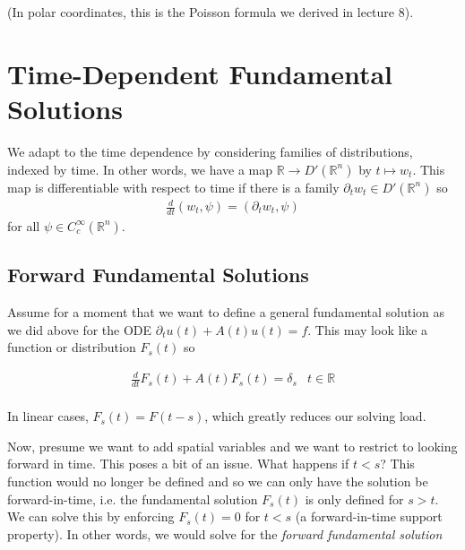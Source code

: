 \documentclass{article}
\newcommand{\R}{{\mathbb{R}}}
\newcommand{\pd}{\partial}
\begin{document}
	(In polar coordinates, this is the Poisson formula we derived in lecture 8).
	
	\section{Time-Dependent Fundamental Solutions}
	
	We adapt to the time dependence by considering families of distributions, indexed by time. In other words, we have a map $\R \to D'(\R^{n})$ by $t \mapsto w_{t}$. This map is differentiable with respect to time if there is a family $\pd_{t} w_{t} \in D'(\R^{n})$ so 
	\begin{align*}
		\frac{d}{dt} (w_{t},\psi) = (\pd_{t}w_{t},\psi)
	\end{align*}
	for all $\psi \in C_{c}^{\infty}(\R^{n})$. 
	
	\subsection{Forward Fundamental Solutions}
	
	
	Assume for a moment that we want to define a general fundamental solution as we did above for the ODE $\pd_{t} u(t) + A(t) u(t) = f$. This may look like a function or distribution $F_{s}(t)$ so 
	
	\begin{align*}
		\frac{d}{dt} F_{s}(t) + A(t)F_{s}(t) = \delta_{s} & t \in \R \\
	\end{align*}
	
	In linear cases, $F_{s}(t) = F(t-s)$, which greatly reduces our solving load. 
	
	
	Now, presume we want to add spatial variables and we want to restrict to looking forward in time. This poses a bit of an issue. What happens if $t<s$? This function would no longer be defined and so we can only have the solution be forward-in-time, i.e. the fundamental solution $F_{s}(t)$ is only defined for $s>t$. We can solve this by enforcing $F_{s}(t) = 0$ for $t<s$ (a forward-in-time support property). In other words, we would solve for the \textit{forward fundamental solution}
	
\end{document}
